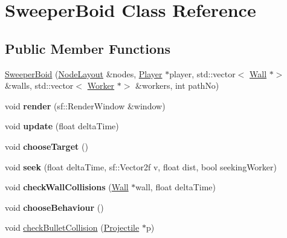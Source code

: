 \hypertarget{class_sweeper_boid}{}\section{Sweeper\+Boid Class Reference}
\label{class_sweeper_boid}
\subsection*{Public Member Functions}
\begin{DoxyCompactItemize}
\item 
\mbox{\hyperlink{class_sweeper_boid_a1beb859233e11e9656ce5b501ee739d0}{Sweeper\+Boid}} (\mbox{\hyperlink{class_node_layout}{Node\+Layout}} \&nodes, \mbox{\hyperlink{class_player}{Player}} $\ast$player, std\+::vector$<$ \mbox{\hyperlink{class_wall}{Wall}} $\ast$$>$ \&walls, std\+::vector$<$ \mbox{\hyperlink{class_worker}{Worker}} $\ast$$>$ \&workers, int path\+No)
\item 
\mbox{\label{class_sweeper_boid_a060fdd3341601b642bec5f298525acc3}} 
void {\bfseries render} (sf\+::\+Render\+Window \&window)
\item 
\mbox{\label{class_sweeper_boid_ace06cb07304ac46df07e70ff77cec967}} 
void {\bfseries update} (float delta\+Time)
\item 
\mbox{\label{class_sweeper_boid_aa7fc2ba9acff8abd55af1872d734181d}} 
void {\bfseries choose\+Target} ()
\item 
\mbox{\label{class_sweeper_boid_ab88569c90abe8ffea6d199d1c4d25fdf}} 
void {\bfseries seek} (float delta\+Time, sf\+::\+Vector2f v, float dist, bool seeking\+Worker)
\item 
\mbox{\label{class_sweeper_boid_a718a85eabf5b4e7e8361ae0e4fd70fec}} 
void {\bfseries check\+Wall\+Collisions} (\mbox{\hyperlink{class_wall}{Wall}} $\ast$wall, float delta\+Time)
\item 
\mbox{\label{class_sweeper_boid_a9e38c7720c06e898a8e1217184ea32fa}} 
void {\bfseries choose\+Behaviour} ()
\item 
void \mbox{\hyperlink{class_sweeper_boid_acf5db66e58a6c7c9322953e2abd4214c}{check\+Bullet\+Collision}} (\mbox{\hyperlink{class_projectile}{Projectile}} $\ast$p)

\end{DoxyCompactItemize}

